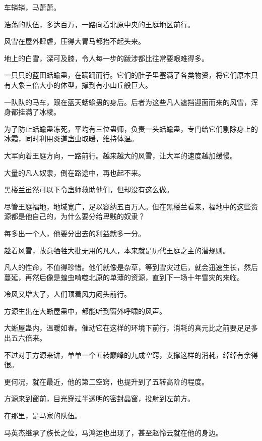 
\begin{this_body}



车辚辚，马萧萧。

浩荡的队伍，多达百万，一路向着北原中央的王庭地区前行。

风雪在屋外肆虐，压得大胃马都抬不起头来。

地上的白雪，深可及膝，令人每一步的跋涉都比往常要艰难得多。

一只只的蓝田蛞蝓蛊，在蹒跚而行。它们的肚子里塞满了各类物资，将它们原本只有大象三倍大小的体型，撑到有小山丘般巨大。

一队队的马车，跟在蓝天蛞蝓蛊的身后。后者为这些凡人遮挡迎面而来的风雪，浑身都挂满了冰棱。

为了防止蛞蝓蛊冻死，平均有三位蛊师，负责一头蛞蝓蛊，专门给它们剔除身上的冰霜，同时利用炎道蛊虫取暖，维持体温。

大军向着王庭方向，一路前行。越来越大的风雪，让大军的速度越加缓慢。

大量的凡人奴隶，倒在路途中，再也起不来。

黑楼兰虽然可以下令蛊师救助他们，但却没有这么做。

尽管王庭福地，地域宽广，足以容纳五百万人。但在黑楼兰看来，福地中的这些资源都是他自己的，为什么要分给卑贱的奴隶？

每多出一个人，他要分出去的利益就多一分。

趁着风雪，故意牺牲大批无用的凡人，本来就是历代王庭之主的潜规则。

凡人的性命，不值得珍惜。他们就像是杂草，等到雪灾过后，就会迅速生长，然后蔓延，再然后像是蝗虫啃噬北原的单薄的资源，直到下一场十年雪灾的来临。

冷风又增大了，人们顶着风力闷头前行。

方源生出在大蜥屋蛊中，都能听到窗外呼啸的风声。

大蜥屋蛊内，温暖如春。催动它在这样的环境下前行，消耗的真元比之前要足足多出五六倍来。

不过对于方源来讲，单单一个五转巅峰的九成空窍，支撑这样的消耗，绰绰有余得很。

更何况，就在最近，他的第二空窍，也提升到了五转高阶的程度。

方源来到窗前，目光穿过半透明的密封晶窗，投射到左前方。

在那里，是马家的队伍。

马英杰继承了族长之位，马鸿运也出现了，甚至赵怜云就在他的身边。


\end{this_body}
